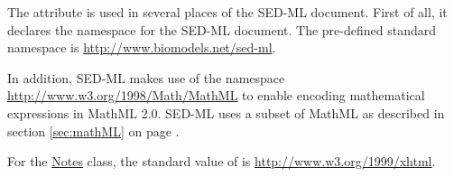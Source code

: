 \label{sec:xmlns}
The  attribute is used in several places of the SED-ML document.
First of all, it declares the namespace for the SED-ML document. The pre-defined standard namespace is \url{http://www.biomodels.net/sed-ml}. 

In addition, SED-ML makes use of the  namespace \url{http://www.w3.org/1998/Math/MathML} to enable encoding mathematical expressions in MathML 2.0. SED-ML uses a subset of MathML as described in section \ref{sec:mathML} on page \pageref{sec:mathML}.

For the \hyperref[class:notes]{Notes} class, the standard value of  is \url{http://www.w3.org/1999/xhtml}.


